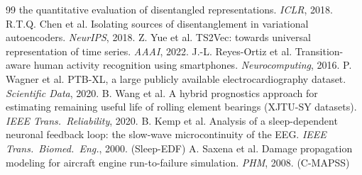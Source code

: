\documentclass[10pt]{article}
\begin{document}
\begin{thebibliography}{99}
the quantitative evaluation of disentangled representations. \emph{ICLR},
2018.
 R.T.Q. Chen et al. Isolating sources of
disentanglement in variational autoencoders. \emph{NeurIPS}, 2018.
 Z. Yue et al. TS2Vec: towards universal
representation of time series. \emph{AAAI}, 2022.
 J.-L. Reyes-Ortiz et al. Transition-aware
human activity recognition using smartphones. \emph{Neurocomputing}, 2016.
 P. Wagner et al. PTB-XL, a large publicly available
electrocardiography dataset. \emph{Scientific Data}, 2020.
 B. Wang et al. A hybrid prognostics approach for
estimating remaining useful life of rolling element bearings (XJTU-SY
datasets). \emph{IEEE Trans.\ Reliability}, 2020.
 B. Kemp et al. Analysis of a sleep-dependent
neuronal feedback loop: the slow-wave microcontinuity of the EEG. \emph{IEEE
Trans.\ Biomed.\ Eng.}, 2000. (Sleep-EDF)
 A. Saxena et al. Damage propagation modeling for
aircraft engine run-to-failure simulation. \emph{PHM}, 2008. (C-MAPSS)
\end{thebibliography}
\end{document}
